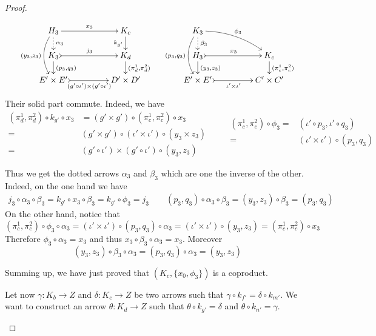 \documentclass[a4paper,UKenglish,cleveref,pdftex,thm-restate,numberwithinsect]{lipics-v2021}
\begin{document}
\begin{proof}
\begin{enumerate}
 \[ \xymatrix@C=45pt@R=15pt{ H_3 \ar@{.>}[d]^{\alpha_3} \ar[r]^{x_3} \ar@/_.4cm/[dd]_{(y_3, z_3)} & K_c \ar[d]_{k_{g'}}& K_3 \ar@{.>}[d]^{\beta_3} \ar@/^.3cm$ $/[dr]^{\phi_3} \ar@/_.4cm/[dd]_{(p_3, q_3)}\\K_3 \ar@{>->}[r]^{j_3}  \ar[d]^{(p_3, q_3)} & K_d \ar[d]^{(\pi^1_d, \pi^2_d)} &  H_3 \ar@{>->}[r]^{x_3}  \ar[d]^{(y_3, z_3)} & K_c \ar[d]^{(\pi^1_c, \pi^2_c)}  \\
   E'\times E' \ar@{>->}[r]_-{(g'\circ \iota')\times (g'\circ \iota')} & D'\times D' & E'\times E' \ar@{>->}[r]_-{ \iota'\times  \iota'} & C'\times C'}\]
 Their solid part commute. Indeed, we have
 \[\begin{split}
 	(\pi^1_d, \pi^2_d)\circ k_{g'}\circ x_3&=(g'\times g')\circ (\pi^1_c, \pi^2_c) \circ x_3\\=&(g'\times g')\circ (\iota'\times \iota')\circ (y_3\times z_3)\\=&(g'\circ \iota') \times (g'\circ \iota')\circ (y_3, z_3)
 \end{split}\qquad \begin{split}
 (\pi^1_c, \pi^2_c)\circ \phi_3=&(\iota'\circ p_3, \iota' \circ q_3)\\=&
(\iota'\times \iota')\circ (p_3, q_3)\\& \end{split}\] 
 
Thus we get the dotted arrows $\alpha_3$ and $\beta_3$ which are one the inverse of the other. Indeed, on the one hand we have
\begin{align*}
j_3\circ \alpha_3\circ \beta_3=k_{g'}\circ x_3\circ \beta_3=k_{g'} \circ \phi_3=j_3  \qquad 
(p_3, q_3)\circ \alpha_3\circ \beta_3=(y_3, z_3)\circ \beta_3=(p_3, q_3) 
\end{align*}
 On the other hand, notice that
 \[(\pi^1_c, \pi^2_c)\circ \phi_3\circ \alpha_3 =(\iota'\times \iota')\circ (p_3, q_3)\circ \alpha_3= (\iota'\times \iota')\circ (y_3, z_3)=(\pi^1_c, \pi^2_c)\circ x_3\]
 Therefore $\phi_3\circ \alpha_3=x_3$ and thus $x_3\circ \beta_3\circ \alpha_3=x_3$. Moreover
 \[(y_3, z_3)\circ \beta_3\circ \alpha_3=(p_3, q_3)\circ \alpha_3=(y_3, z_3)\]
 
 Summing up, we have just proved that $(K_c, \{x_0, \phi_3\})$ is a coproduct.
 
 
 Let now $\gamma\colon K_b\to Z$ and $\delta\colon K_c\to Z$ be two arrows such that $\gamma\circ k_{f'}=\delta\circ k_{m'}$. We want to construct an arrow $\theta\colon K_d\to Z$ such that $\theta\circ k_{g'}=\delta$ and $\theta\circ k_{n'}=\gamma$.	
 

\end{enumerate}
\end{proof}
\end{document}
